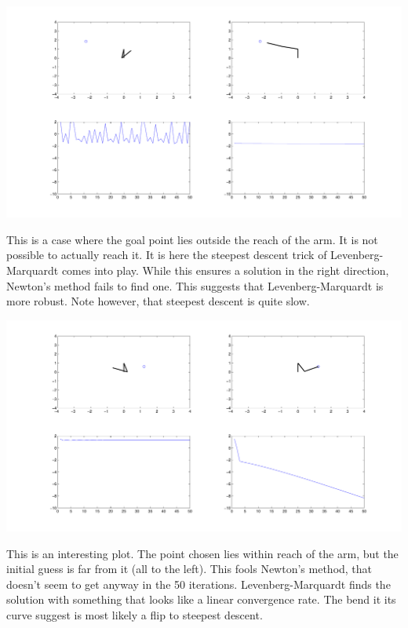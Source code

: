 \documentclass[10pt,oneside,a4paper,final,english]{memoir}
\begin{document}
\begin{center}
\includegraphics[width=1\textwidth]{images/shot2.pdf}\\
\end{center}
This is a case where the goal point lies outside the reach of the
arm. It is not possible to actually reach it. It is here the steepest
descent trick of Levenberg-Marquardt comes into play. While this
ensures a solution in the right direction, Newton's method fails to
find one. This suggests that Levenberg-Marquardt is more robust. Note
however, that steepest descent is quite slow.


\begin{center}
\includegraphics[width=1\textwidth]{images/shot3.pdf}\\
\end{center}
This is an interesting plot. The point chosen lies within reach of the
arm, but the initial guess is far from it (all to the left). This
fools Newton's method, that doesn't seem to get anyway in the 50
iterations. Levenberg-Marquardt finds the solution with something
that looks like a linear convergence rate. The bend it its curve
suggest is most likely a flip to steepest descent.
\end{document}
